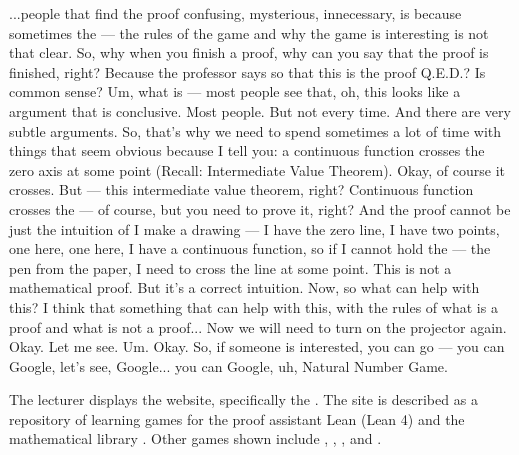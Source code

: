 \begin{spoken-clean}[00:00:00 - 00:01:56]
...people that find the proof confusing, mysterious, innecessary, is because sometimes the --- the rules of the game and why the game is interesting is not that clear. So, why when you finish a proof, why can you say that the proof is finished, right? Because the professor says so that this is the proof Q.E.D.? Is common sense? Um, what is --- most people see that, oh, this looks like a argument that is conclusive. Most people. But not every time. And there are very subtle arguments. So, that's why we need to spend sometimes a lot of time with things that seem obvious because I tell you: a continuous function crosses the zero axis at some point (Recall: Intermediate Value Theorem). Okay, of course it crosses. But --- this intermediate value theorem, right? Continuous function crosses the --- of course, but you need to prove it, right? And the proof cannot be just the intuition of I make a drawing --- I have the zero line, I have two points, one here, one here, I have a continuous function, so if I cannot hold the --- the pen from the paper, I need to cross the line at some point. This is not a mathematical proof. But it's a correct intuition. Now, so what can help with this? I think that something that can help with this, with the rules of what is a proof and what is not a proof...  Now we will need to turn on the projector again. Okay. Let me see. Um. Okay. So, if someone is interested, you can go --- you can Google, let's see, Google... you can Google, uh, Natural Number Game. 
\end{spoken-clean}

\begin{meta-note}
The lecturer displays the  website, specifically the . The site is described as a repository of learning games for the proof assistant Lean (Lean 4) and the mathematical library . Other games shown include , , , and .
\end{meta-note}

